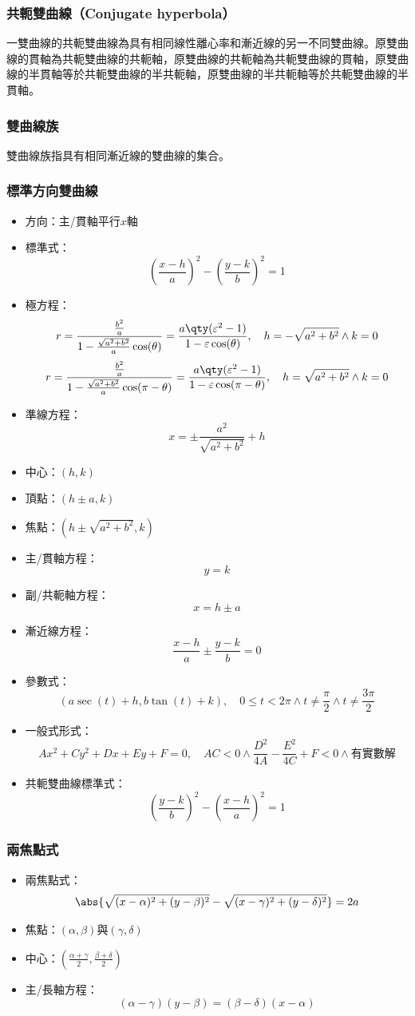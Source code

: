 \documentclass[a4paper,12pt]{report}
\begin{document}
\subsubsection{共軛雙曲線（Conjugate hyperbola）}
一雙曲線的共軛雙曲線為具有相同線性離心率和漸近線的另一不同雙曲線。原雙曲線的貫軸為共軛雙曲線的共軛軸，原雙曲線的共軛軸為共軛雙曲線的貫軸，原雙曲線的半貫軸等於共軛雙曲線的半共軛軸，原雙曲線的半共軛軸等於共軛雙曲線的半貫軸。
\subsubsection{雙曲線族}
雙曲線族指具有相同漸近線的雙曲線的集合。
\subsubsection{標準方向雙曲線}
\begin{itemize}
\item 方向：主/貫軸平行$x$軸
\item 標準式：
\[\left(\frac{x-h}{a}\right)^2-\left(\frac{y-k}{b}\right)^2=1\]
\item 極方程：
\[r=\frac{\frac{b^2}{a}}{1-\frac{\sqrt{a^2+b^2}}{a}\cos(\theta)}=\frac{a\qty(\varepsilon^2-1)}{1-\varepsilon\cos(\theta)},\quad h=-\sqrt{a^2+b^2}\land k=0\]
\[r=\frac{\frac{b^2}{a}}{1-\frac{\sqrt{a^2+b^2}}{a}\cos(\pi-\theta)}=\frac{a\qty(\varepsilon^2-1)}{1-\varepsilon\cos(\pi-\theta)},\quad h=\sqrt{a^2+b^2}\land k=0\]
\item 準線方程：
\[x=\pm\frac{a^2}{\sqrt{a^2+b^2}}+h\]
\item 中心：$(h,k)$
\item 頂點：$(h\pm a,k)$
\item 焦點：$(h\pm\sqrt{a^2+b^2},k)$
\item 主/貫軸方程：
\[y=k\]
\item 副/共軛軸方程：
\[x=h\pm a\]
\item 漸近線方程：
\[\frac{x-h}{a}\pm\frac{y-k}{b}=0\]
\item 參數式：
\[(a\sec(t)+h,b\tan(t)+k),\quad0\leq t<2\pi\land t\neq\frac{\pi}{2}\land t\neq\frac{3\pi}{2}\]
\item 一般式形式：
\[Ax^2+Cy^2+Dx+Ey+F=0,\quad AC<0\land\frac{D^2}{4A}-\frac{E^2}{4C}+F<0\land\text{有實數解}\]
\item 共軛雙曲線標準式：
\[\left(\frac{y-k}{b}\right)^2-\left(\frac{x-h}{a}\right)^2=1\]
\end{itemize}
\subsubsection{兩焦點式}
\begin{itemize}
\item 兩焦點式：
\[\abs{\sqrt{(x-\alpha)^2+(y-\beta)^2}-\sqrt{(x-\gamma)^2+(y-\delta)^2}}=2a\]
\item 焦點：$(\alpha,\beta)$與$(\gamma,\delta)$
\item 中心：$\left(\frac{\alpha+\gamma}{2},\frac{\beta+\delta}{2}\right)$
\item 主/長軸方程：
\[(\alpha-\gamma)(y-\beta)=(\beta-\delta)(x-\alpha)\]
\end{itemize}
\end{document}
